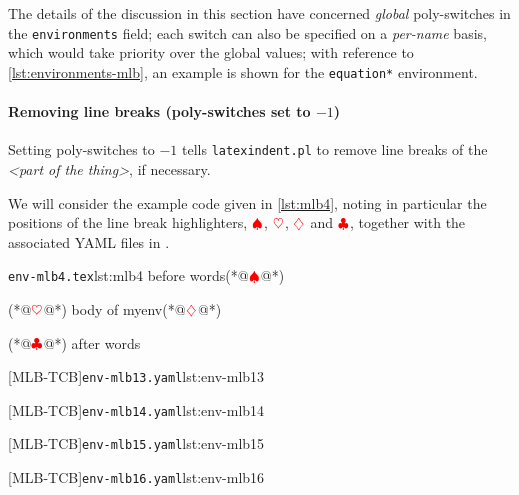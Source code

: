   The details of the discussion in this section have concerned \emph{global} poly-switches
  in the \texttt{environments} field; each switch can also be specified on a
  \emph{per-name} basis, which would take priority over the global values; with reference
  to \vref{lst:environments-mlb}, an example is shown for the \texttt{equation*}
  environment.

 \paragraph{Removing line breaks (poly-switches set to $-1$)}
  Setting poly-switches to $-1$ tells \texttt{latexindent.pl} to remove line breaks of the
  \emph{<part of the thing>}, if necessary.

  \begin{example}
  We will consider the example code given in \cref{lst:mlb4}, noting in particular the
  positions of the line break highlighters, $\color{red}\spadesuit$,
  $\color{red}\heartsuit$, $\color{red}\diamondsuit$ and $\color{red}\clubsuit$, together
  with the associated YAML files in .

  \begin{minipage}{.45\linewidth}
   \begin{cmhlistings}[style=tcblatex,escapeinside={(*@}{@*)}]{\texttt{env-mlb4.tex}}{lst:mlb4}
before words(*@$\color{red}\spadesuit$@*)
\begin{myenv}(*@$\color{red}\heartsuit$@*)
body of myenv(*@$\color{red}\diamondsuit$@*)
\end{myenv}(*@$\color{red}\clubsuit$@*)
after words
\end{cmhlistings}
  \end{minipage}%
  \hfill
  \begin{minipage}{.51\textwidth}
   [MLB-TCB]{\texttt{env-mlb13.yaml}}{lst:env-mlb13}

   [MLB-TCB]{\texttt{env-mlb14.yaml}}{lst:env-mlb14}

   [MLB-TCB]{\texttt{env-mlb15.yaml}}{lst:env-mlb15}

   [MLB-TCB]{\texttt{env-mlb16.yaml}}{lst:env-mlb16}
  \end{minipage}


\end{example}
